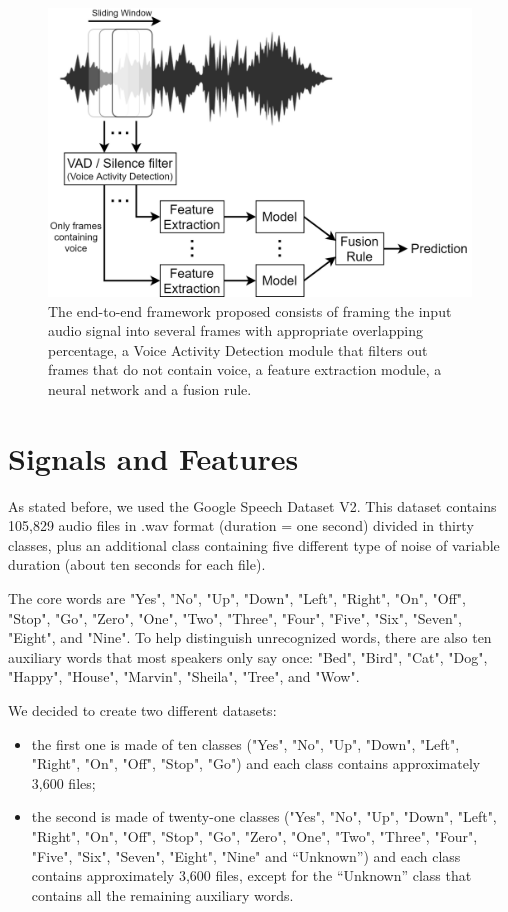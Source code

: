 \documentclass[conference]{IEEEtran}
\begin{document}
\begin{figure}
\centering
\includegraphics[scale=0.23]{End-To-End}
\caption{The end-to-end framework proposed consists of framing the input audio signal into several frames with appropriate overlapping percentage, a Voice Activity Detection module that filters out frames that do not contain voice, a feature extraction module, a neural network and a fusion rule.}
\end{figure}

\section{Signals and Features}
As stated before, we used the Google Speech Dataset V2. This dataset contains 105,829 audio files in .wav format (duration =  one second) divided in thirty classes, plus an additional class containing five different type of noise of variable duration (about ten seconds for each file).

The core words are "Yes", "No", "Up", "Down", "Left", "Right", "On", "Off", "Stop", "Go", "Zero", "One", "Two", "Three", "Four", "Five", "Six", "Seven", "Eight", and "Nine". To help distinguish unrecognized words, there are also ten auxiliary words that most speakers only say once: "Bed", "Bird", "Cat", "Dog", "Happy", "House", "Marvin", "Sheila", "Tree", and "Wow".

We decided to create two different datasets:
\begin{itemize}
\item the first one is made of ten classes ("Yes", "No", "Up", "Down", "Left", "Right", "On", "Off", "Stop", "Go") and each class contains approximately 3,600 files;
\item the second is made of twenty-one classes ("Yes", "No", "Up", "Down", "Left", "Right", "On", "Off", "Stop", "Go", "Zero", "One", "Two", "Three", "Four", "Five", "Six", "Seven", "Eight", "Nine" and “Unknown”) and each class contains approximately 3,600 files, except for the “Unknown” class that contains all the remaining auxiliary words.
\end{itemize}
\end{document}
